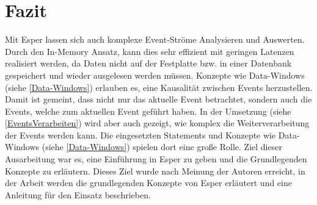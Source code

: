 \chapter{Fazit}
Mit Esper lassen sich auch komplexe Event-Ströme Analysieren und Auswerten. Durch den In-Memory Ansatz, kann dies sehr effizient mit geringen Latenzen realisiert werden,
da Daten nicht auf der Festplatte bzw. in einer Datenbank gespeichert und wieder ausgelesen werden müssen.
\absatz
Konzepte wie Data-Windows (siehe \ref{Data-Windows}) erlauben es, eine Kausalität zwischen Events herzustellen.
Damit ist gemeint, dass nicht nur das aktuelle Event betrachtet, sondern auch die Events, welche zum aktuellen Event geführt haben.
\absatz
In der Umsetzung (siehe \ref{EventsVerarbeiten}) wird aber auch gezeigt, wie komplex die Weiterverarbeitung der Events werden kann. Die eingesetzten Statements und Konzepte wie Data-Windows (siehe \ref{Data-Windows}) spielen dort eine große Rolle.
\absatz
Ziel dieser Ausarbeitung war es, eine Einführung in Esper zu geben und die Grundlegenden Konzepte zu erläutern. Dieses Ziel wurde nach Meinung der Autoren erreicht, in der Arbeit werden die grundlegenden Konzepte von Esper erläutert und eine Anleitung für den Einsatz beschrieben.